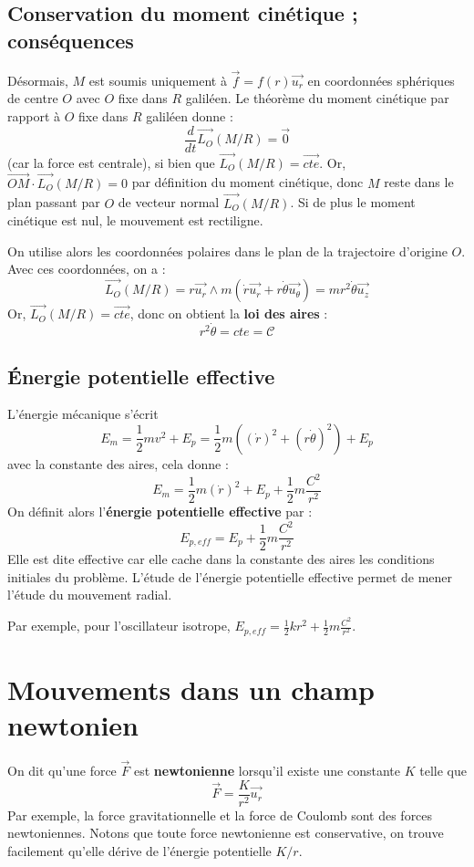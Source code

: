 \documentclass[french]{book}
\theoremstyle{plain}
\theoremstyle{definition}
\theoremstyle{remark}
\begin{document}
\subsection{Conservation du moment cinétique ; conséquences}
Désormais, $M$ est soumis uniquement à $\overrightarrow{f}=f(r)\overrightarrow{u_r}$ en coordonnées sphériques de centre $O$ avec $O$ fixe dans $R$ galiléen. Le théorème du moment cinétique par rapport à $O$ fixe dans $R$ galiléen donne : $$\displaystyle\frac{d}{dt}\overrightarrow{L_O}(M/R)=\overrightarrow{0}$$ (car la force est centrale), si bien que $\overrightarrow{L_O}(M/R)=\overrightarrow{cte}$. Or, $\overrightarrow{OM}\cdot\overrightarrow{L_O}(M/R)=0$ par définition du moment cinétique, donc $M$ reste dans le plan passant par $O$ de vecteur normal $\overrightarrow{L_O}(M/R)$. Si de plus le moment cinétique est nul, le mouvement est rectiligne. \\ \par On utilise alors les coordonnées polaires dans le plan de la trajectoire d'origine $O$. Avec ces coordonnées, on a : $$\overrightarrow{L_O}(M/R)=r\overrightarrow{u_r}\wedge m(\dot{r}\overrightarrow{u_r}+r\dot{\theta}\overrightarrow{u_\theta})=mr^2\dot{\theta}\overrightarrow{u_z}$$ Or, $\overrightarrow{L_O}(M/R)=\overrightarrow{cte}$, donc on obtient la \textbf{loi des aires} : $$r^2\dot{\theta}=cte=\mathcal{C}$$
\subsection{Énergie potentielle effective}
L'énergie mécanique s'écrit $$E_m=\frac{1}{2}mv^2+E_p=\frac{1}{2}m\left(\left(\dot{r}\right)^2+\left(r\dot\theta\right)^2\right)+E_p$$ avec la constante des aires, cela donne : $$E_m=\frac{1}{2}m\left(\dot{r}\right)^2+E_p+\frac{1}{2}m\frac{C^2}{r^2}$$ On définit alors l'\textbf{énergie potentielle effective} par : $$E_{p,eff}=E_p+\frac{1}{2}m\frac{C^2}{r^2}$$ Elle est dite effective car elle cache dans la constante des aires les conditions initiales du problème. L'étude de l'énergie potentielle effective permet de mener l'étude du mouvement radial. \\ \par Par exemple, pour l'oscillateur isotrope, $E_{p,eff}=\displaystyle\frac{1}{2}kr^2+\frac{1}{2}m\frac{C^2}{r^2}$.
\section{Mouvements dans un champ newtonien}
On dit qu'une force $\overrightarrow{F}$ est \textbf{newtonienne} lorsqu'il existe une constante $K$ telle que $$\overrightarrow{F}=\frac{K}{r^2}\overrightarrow{u_r}$$ Par exemple, la force gravitationnelle et la force de Coulomb sont des forces newtoniennes. Notons que toute force newtonienne est conservative, on trouve facilement qu'elle dérive de l'énergie potentielle $K/r$.
\end{document}

